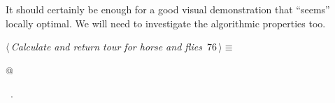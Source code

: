\documentclass[11.5pt]{report}
\begin{document}
It should certainly be enough for a good visual demonstration that ``seems'' locally optimal. 
We will need to investigate the algorithmic properties too. 
\begin{flushleft} \small
\begin{minipage}{\linewidth}\label{scrap114}\raggedright\small
{} $\langle\,${\itshape Calculate and return tour for horse and flies}\nobreak\ {\footnotesize {76}}$\,\rangle\equiv$
\vspace{-1ex}
\begin{list}{}{} \item
\mbox{}\verb@  @\\
\mbox{}\verb@@{\NWsep}
\end{list}
\vspace{-1.5ex}
\footnotesize
\begin{list}{}{\setlength{\itemsep}{-\parsep}\setlength{\itemindent}{-\leftmargin}}
\item \NWtxtMacroRefIn\ .

\item{}
\end{list}
\end{minipage}\vspace{4ex}
\end{flushleft}

\end{document}
